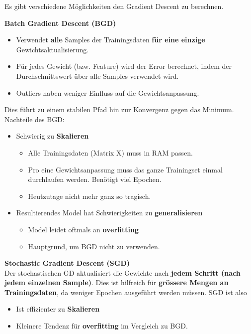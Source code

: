 Es gibt verschiedene Möglichkeiten den Gradient Descent zu berechnen.

\textbf{Batch Gradient Descent (BGD)} \\


\begin{itemize}
	\item Verwendet \textbf{alle} Samples der Trainingsdaten \textbf{für eine einzige} Gewichtsaktualisierung.
	\item Für jedes Gewicht (bzw. Feature) wird der Error berechnet, indem der Durchschnittswert über alle Samples verwendet wird.
	\item Outliers haben weniger Einfluss auf die Gewichtsanpassung.
\end{itemize}

Dies führt zu einem stabilen Pfad hin zur Konvergenz gegen das Minimum. \\

Nachteile des BGD:

\begin{itemize}
	\item Schwierig zu \textbf{Skalieren}
	\begin{itemize}
		\item Alle Trainingsdaten (Matrix X) muss in RAM passen.
		\item Pro eine Gewichtsanpassung muss das ganze Trainingset einmal durchlaufen werden. Benötigt viel Epochen.
		\item Heutzutage nicht mehr ganz so tragisch.
	\end{itemize}
	\item Resultierendes Model hat Schwierigkeiten zu \textbf{generalisieren}
	\begin{itemize}
		\item Model leidet oftmals an \textbf{overfitting}
		\item Hauptgrund, um BGD nicht zu verwenden.
	\end{itemize}
\end{itemize}




\textbf{Stochastic Gradient Descent (SGD)} \\

Der stochastischen GD aktualisiert die Gewichte nach \textbf{jedem Schritt (nach jedem einzelnen Sample)}. Dies ist hilfreich für \textbf{grössere Mengen an Trainingsdaten}, da weniger Epochen ausgeführt werden müssen. SGD ist also 

\begin{itemize}
	\item Ist effizienter zu \textbf{Skalieren}
	\item Kleinere Tendenz für \textbf{overfitting} im Vergleich zu BGD.
\end{itemize}


